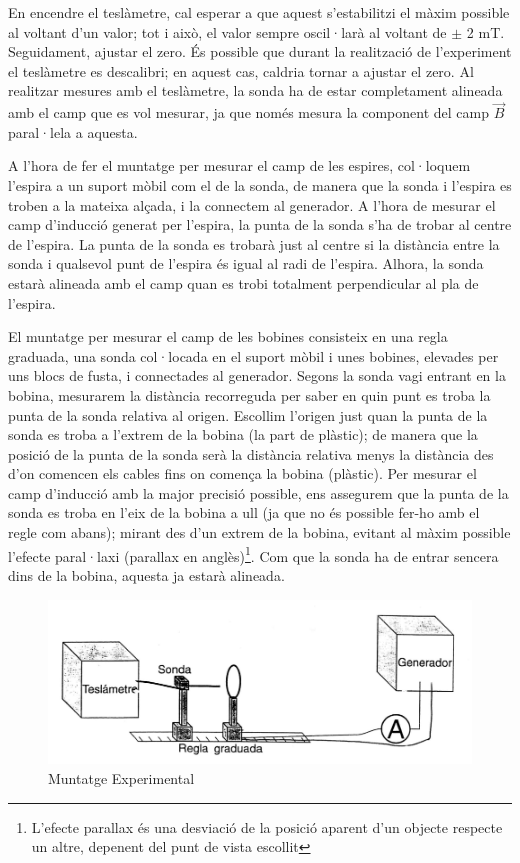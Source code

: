 \documentclass[11pt]{article}
\numberwithin{equation}{section}
\numberwithin{figure}{section}
\numberwithin{table}{section}
\begin{document}
En encendre el teslàmetre, cal esperar a que aquest s'estabilitzi el màxim possible al voltant d'un valor; tot i això, el valor sempre oscil·larà al voltant de $\pm$ 2 mT. Seguidament, ajustar el zero. És possible que durant la realització de l'experiment el teslàmetre es descalibri; en aquest cas, caldria tornar a ajustar el zero. Al realitzar mesures amb el teslàmetre, la sonda ha de estar completament alineada amb el camp que es vol mesurar, ja que només mesura la component del camp $\vec{B}$ paral·lela a aquesta.

A l'hora de fer el muntatge per mesurar el camp de les espires, col·loquem l'espira a un suport mòbil com el de la sonda, de manera que la sonda i l'espira es troben a la mateixa alçada, i la connectem al generador. A l'hora de mesurar el camp d'inducció generat per l'espira, la punta de la sonda s'ha de trobar al centre de l'espira. La punta de la sonda es trobarà just al centre si la distància entre la sonda i qualsevol punt de l'espira és igual al radi de l'espira. Alhora, la sonda estarà alineada amb el camp quan es trobi totalment perpendicular al pla de l'espira. 


El muntatge per mesurar el camp de les bobines consisteix en una regla graduada, una sonda col·locada en el suport mòbil i unes bobines, elevades per uns blocs de fusta, i connectades al generador. 
Segons la sonda vagi entrant en la bobina, mesurarem la distància recorreguda per saber en quin punt es troba la punta de la sonda relativa al origen. Escollim l'origen just quan la punta de la sonda es troba a l'extrem de la bobina (la part de plàstic); de manera que la posició de la punta de la sonda serà la distància relativa menys la distància des d'on comencen els cables fins on comença la bobina (plàstic).
Per mesurar el camp d'inducció amb la major precisió possible, ens assegurem que la punta de la sonda es troba en l'eix de la bobina a ull (ja que no és possible fer-ho amb el regle com abans); mirant des d'un extrem de la bobina, evitant al màxim possible l'efecte paral·laxi (parallax en anglès)\footnote{L'efecte parallax és una desviació de la posició aparent d'un objecte respecte un altre, depenent del punt de vista escollit}. Com que la sonda ha de entrar sencera dins de la bobina, aquesta ja estarà alineada.



\begin{figure}[H]
    \centering
    \includegraphics[width=0.75\linewidth]{Muntatge Experimental.png}
    \caption{Muntatge Experimental}
    \label{fig: muntatge}
\end{figure}
\end{document}
